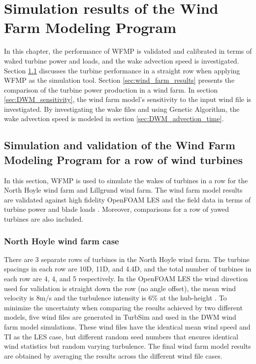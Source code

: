 \documentclass{umthesis}
\begin{document}
\chapter{Simulation results of the Wind Farm Modeling Program}
In this chapter, the performance of WFMP is validated and calibrated in terms of waked turbine power and loads, and the wake advection speed is investigated. Section \ref{sec:row_results} discusses the turbine performance in a straight row when applying WFMP as the simulation tool. Section \ref{sec:wind_farm_results} presents the comparison of the turbine power production in a wind farm. In section \ref{sec:DWM_sensitivity}, the wind farm model's sensitivity to the input wind file is investigated. By investigating the wake files and using Genetic Algorithm, the wake advection speed is modeled in section \ref{sec:DWM_advection_time}.

\section{Simulation and validation of the Wind Farm Modeling Program for a row of wind turbines}\label{sec:row_results}
In this section, WFMP is used to simulate the wakes of turbines in a row for the North Hoyle wind farm and Lillgrund wind farm. The wind farm model results are validated against high fidelity OpenFOAM LES and the field data in terms of turbine power and blade loads \cite{Churchfield_LES}. Moreover, comparisons for a row of yawed turbines are also included.

\subsection{North Hoyle wind farm case}
There are $3$ separate rows of turbines in the North Hoyle wind farm. The turbine spacings in each row are 10D, 11D, and 4.4D, and the total number of turbines in each row are 4, 4, and 5 respectively. In the OpenFOAM LES the wind direction used for validation is straight down the row (no angle offset), the mean wind velocity is 8m/s and the turbulence intensity is 6\% at the hub-height \cite{Churchfield_LES}. To minimize the uncertainty when comparing the results achieved by two different models, five wind files are generated in TurbSim and used in the DWM wind farm model simulations. These wind files have the identical mean wind speed and TI as the LES case, but different random seed numbers that ensures identical wind statistics but random varying turbulence. The final wind farm model results are obtained by averaging the results across the different wind file cases.
\end{document}
